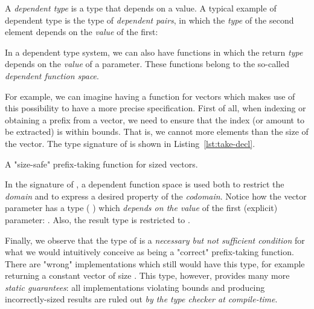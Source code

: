             A \emph{dependent type} is a type that depends on a value.
            A typical example of dependent type is the type of \emph{dependent pairs},
            in which the \emph{type} of the second element depends on the \emph{value} of the first:

            \begin{center}
            \end{center}

            In a dependent type system, we can also have functions in which the return \emph{type}
            depends on the \emph{value} of a parameter.
            These functions belong to the so-called \emph{dependent function space}.

            For example, we can imagine having a  function for vectors which makes use
            of this possibility to have a more precise specification.
            First of all, when indexing or obtaining a prefix from a vector,
            we need to ensure that the index (or amount to be extracted) is within bounds.
            That is, we cannot  more elements than the size of the vector.
            The type signature of  is shown in Listing~\ref{lst:take-decl}.

            \begin{listing}[h]
                \caption{A "size-safe" prefix-taking function for sized vectors. \label{lst:take-decl}}
            \end{listing}

            In the signature of , a dependent function space is used both
            to restrict the \emph{domain} and to express a desired property of the \emph{codomain}.
            Notice how the vector parameter has a type (  \AY{(} \AF{+} \AY{)})
            which \emph{depends on the value} of the first (explicit) parameter: .
            Also, the result type is restricted to   .

            Finally, we observe that the type of  is a \emph{necessary but not sufficient condition}
            for what we would intuitively conceive as being a "correct" prefix-taking function.
            There are "wrong" implementations which still would have this type, for example
            returning a constant vector of size .
            This type, however, provides many more \emph{static guarantees}:
            all implementations violating bounds and producing incorrectly-sized results
            are ruled out \emph{by the type checker at compile-time}.

